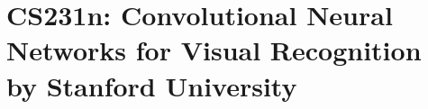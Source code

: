 \cleardoublepage %



\part{CS231n: Convolutional Neural Networks for Visual Recognition by Stanford University} %
%


\cleardoublepage %






%
%



